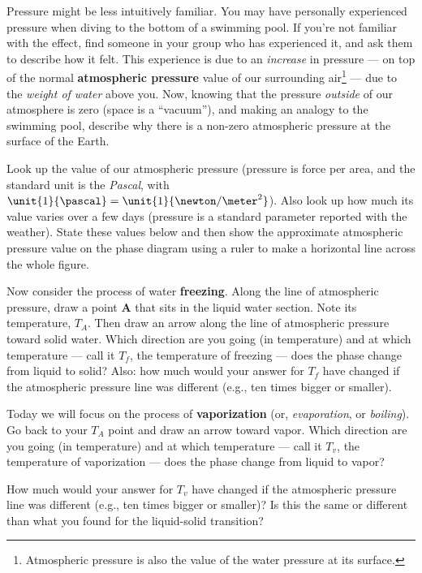 \noindent Pressure might be less intuitively familiar.  You may have personally experienced pressure when diving to the bottom of a swimming pool. If you're not familiar with the effect, find someone in your group who has experienced it, and ask them to describe how it felt.  This experience is due to an {\em increase} in pressure --- on top of the normal {\bf atmospheric pressure} value of our surrounding air\footnote{Atmospheric pressure is also the value of the water pressure at its surface.} ---  due to the {\em weight of water} above you.  Now, knowing that the pressure {\em outside} of our atmosphere is zero (space is a ``vacuum''), and making an analogy to the swimming pool, describe why there is a non-zero atmospheric pressure at the surface of the Earth.

\answerspace

\noindent Look up the value of our atmospheric pressure (pressure is force per area, and the standard unit is the {\em Pascal}, with  $\unit{1}{\pascal} = \unit{1}{\newton/\meter^2}$).  Also look up how much its value varies over a few days (pressure is a standard parameter reported with the weather).  State these values below and then show the approximate atmospheric pressure value on the phase diagram using a ruler to make a horizontal line across the whole figure.

\answerspace[2cm]

\noindent Now consider the process of water {\bf freezing}.  Along the line of atmospheric pressure, draw a point {\bf A} that sits in the liquid water section.  Note its temperature, $T_A$.  Then draw an arrow along the line of atmospheric pressure toward solid water.  Which direction are you going (in temperature) and at which temperature --- call it $T_f$, the temperature of freezing --- does the phase change from liquid to solid?  Also: how much would your answer for $T_f$  have changed if the atmospheric pressure line was different (e.g., ten times bigger or smaller).

\answerspace[3cm]

\noindent Today we will focus on the process of {\bf vaporization} (or, {\em evaporation}, or {\em boiling}). Go back to your $T_A$ point and draw an arrow toward vapor.  Which direction are you going (in temperature) and at which temperature --- call it $T_v$, the temperature of vaporization --- does the phase change from liquid to vapor?  

\answerspace[1.2cm]

\noindent How much would your answer for $T_v$  have changed if the atmospheric pressure line was different (e.g., ten times bigger or smaller)?  Is this the same or different than what you found for the liquid-solid transition?



